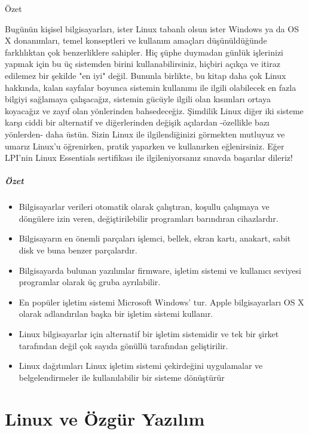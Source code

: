 \documentclass[10pt,a5paper]{book}
\begin{document}
\begin{section}{Özet}

Bugünün kişisel bilgisayarları, ister Linux tabanlı olsun ister Windows ya da OS X donanımları, temel konseptleri ve kullanım amaçları düşünüldüğünde farklılıktan çok benzerliklere sahipler. Hiç şüphe duymadan günlük işlerinizi yapmak için bu üç sistemden birini kullanabilirsiniz, hiçbiri açıkça ve itiraz edilemez bir şekilde "en iyi" değil. Bununla birlikte, bu kitap daha çok Linux hakkında, kalan sayfalar boyunca sistemin kullanımı ile ilgili olabilecek en fazla bilgiyi sağlamaya çalışacağız, sistemin gücüyle ilgili olan kısımları ortaya koyacağız ve zayıf olan yönlerinden bahsedeceğiz. Şimdilik Linux diğer iki sisteme karşı ciddi bir alternatif ve diğerlerinden değişik açılardan -özellikle bazı yönlerden- daha üstün. Sizin Linux ile ilgilendiğinizi görmekten mutluyuz ve umarız Linux'u öğrenirken, pratik yaparken ve kullanırken eğlenirsiniz. Eğer LPI'nin Linux Essentials sertifikası ile ilgileniyorsanız sınavda başarılar dileriz!
\paragraph{Özet}{
\begin{itemize}
\item Bilgisayarlar verileri otomatik olarak çalıştıran, koşullu çalışmaya ve döngülere izin veren, değiştirilebilir programları barındıran cihazlardır.
\item Bilgisayarın en önemli parçaları işlemci, bellek, ekran kartı, anakart, sabit disk ve buna benzer parçalardır. 
\item Bilgisayarda bulunan yazılımlar firmware, işletim sistemi ve kullanıcı seviyesi programlar olarak üç gruba ayrılabilir. 
\item En popüler işletim sistemi Microsoft Windows' tur. Apple bilgisayarları OS X olarak adlandırılan başka bir işletim sistemi kullanır.
\item Linux bilgisayarlar için alternatif bir işletim sistemidir ve tek bir şirket tarafından değil çok sayıda gönüllü tarafından geliştirilir. 
\item Linux dağıtımları Linux işletim sistemi çekirdeğini uygulamalar ve belgelendirmeler ile kullanılabilir bir sisteme dönüştürür
\end{itemize}}
\end{section}


\chapter{Linux ve Özgür Yazılım}
\end{document}
